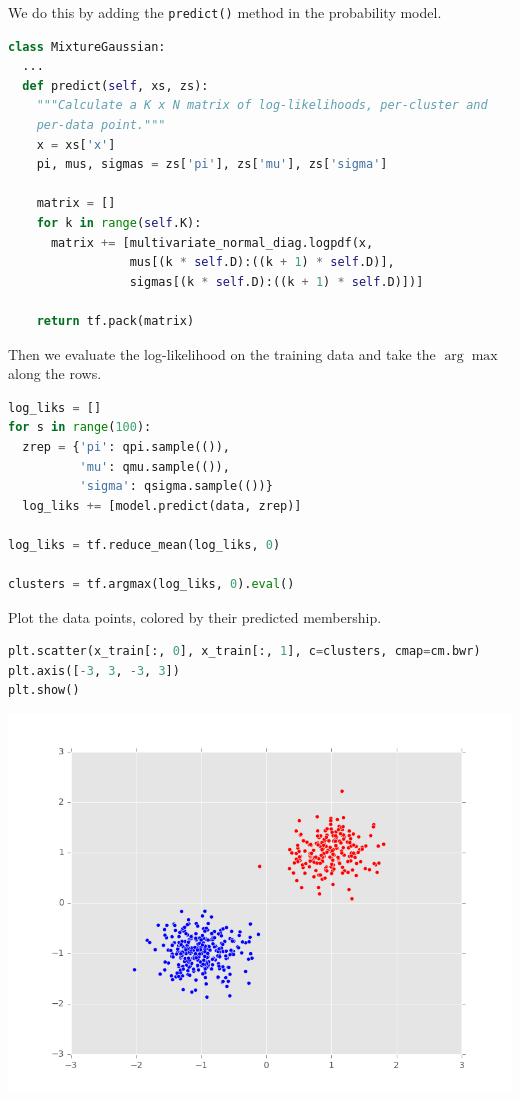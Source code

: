 We do this by adding the \texttt{predict()} method in the
probability model.
\begin{lstlisting}[language=Python]
class MixtureGaussian:
  ...
  def predict(self, xs, zs):
    """Calculate a K x N matrix of log-likelihoods, per-cluster and
    per-data point."""
    x = xs['x']
    pi, mus, sigmas = zs['pi'], zs['mu'], zs['sigma']

    matrix = []
    for k in range(self.K):
      matrix += [multivariate_normal_diag.logpdf(x,
                 mus[(k * self.D):((k + 1) * self.D)],
                 sigmas[(k * self.D):((k + 1) * self.D)])]

    return tf.pack(matrix)
\end{lstlisting}
Then we evaluate the log-likelihood on the training data
and take the $\arg\max$ along the rows.
\begin{lstlisting}[language=Python]
log_liks = []
for s in range(100):
  zrep = {'pi': qpi.sample(()),
          'mu': qmu.sample(()),
          'sigma': qsigma.sample(())}
  log_liks += [model.predict(data, zrep)]

log_liks = tf.reduce_mean(log_liks, 0)

clusters = tf.argmax(log_liks, 0).eval()
\end{lstlisting}

Plot the data points, colored by their predicted membership.
\begin{lstlisting}[language=Python]
plt.scatter(x_train[:, 0], x_train[:, 1], c=clusters, cmap=cm.bwr)
plt.axis([-3, 3, -3, 3])
plt.show()
\end{lstlisting}

\includegraphics[width=700px]{images/unsupervised-fig1.png}
